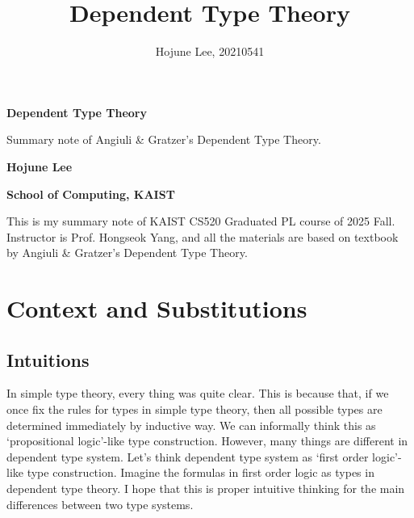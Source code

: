 \documentclass[12pt, a4paper, openany, twoside]{book}
\author{Hojune Lee, 20210541}
\title{Dependent Type Theory}
\theoremstyle{definition}
\theoremstyle{remark}
\theoremstyle{plain}
\numberwithin{equation}{section}
\begin{document}
\begin{titlepage}
    \begin{center}
        \vspace*{9cm}
            
        \Huge
        \textbf{Dependent Type Theory}
    
        \vspace{1cm}
        \large
        Summary note of Angiuli \& Gratzer's Dependent Type Theory.
        \vspace{3cm}
        
        \LARGE
        \textbf{Hojune Lee}
            
        \vspace{8cm}
            
        \normalsize
        \textbf{School of Computing, KAIST}\\  
    \end{center}
\end{titlepage}

This is my summary note of KAIST CS520 Graduated PL course of 2025 Fall.
Instructor is Prof. Hongseok Yang, and all the materials are based on 
textbook by Angiuli \& Gratzer's Dependent Type Theory. 

\hypersetup{linkcolor=black}
\tableofcontents
\hypersetup{linkcolor=blue}

\newpage 

\chapter{Context and Substitutions}

\section{Intuitions}

In simple type theory, every thing was quite clear. This is because that, if we once fix the rules for types in simple type theory, 
then all possible types are determined immediately by inductive way. We can informally think this as \lq propositional logic'-like type construction. 
However, many things are different in dependent type system. Let's think dependent type system as \lq first order logic'-like type construction. 
Imagine the formulas in first order logic as types in dependent type theory. 
I hope that this is proper intuitive thinking for the main differences between two type systems. \\
\end{document}
